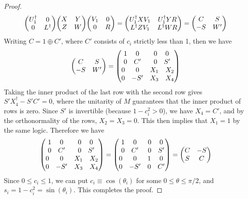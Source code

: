\documentclass[11pt]{article}
\begin{document}
\begin{proof}
    $$
    \mqty(U_1^\dagger & 0 \\ 0 & L^\dagger)\mqty(X & Y \\ Z & W) \mqty(V_1 & 0 \\ 0 & R) = \mqty(U_1^\dagger X V_1 & U^\dagger_1YR \\  L^\dagger ZV_1 & L^\dagger WR) = \mqty(C & S \\ -S & W')
    $$
    Writing $C = 1 \oplus C'$, where $C'$ consists of $c_i$ strictly less than 1, then we have
$$
    \mqty(C & S \\ -S & W') = \mqty(\mqty{1 & 0 \\ 0 & C'}  & \mqty{0 & 0 \\ 0 & S'} \\ \mqty{0 & 0 \\ 0 & -S'} & \mqty{X_1 & X_2 \\ X_3 & X_4})
$$
Taking the inner product of the last row with the second row gives $S'X_4^\dagger-S'C' = 0$, where the unitarity of $M$ guarantees that the inner product of rows is zero. Since $S'$ is invertible (because $1-c_i^2 > 0$), we have $X_4 = C'$, and by the orthonormality of the rows, $X_2 = X_3 = 0$. This then implies that $X_1 = 1$ by the same logic. Therefore we have
$$
    \mqty(\mqty{1 & 0 \\ 0 & C'}  & \mqty{0 & 0 \\ 0 & S'} \\ \mqty{0 & 0 \\ 0 & -S'} & \mqty{X_1 & X_2 \\ X_3 & X_4}) = \mqty(\mqty{1 & 0 \\ 0 & C'}  & \mqty{0 & 0 \\ 0 & S'} \\ \mqty{0 & 0 \\ 0 & -S'} & \mqty{1 & 0 \\ 0 & C'}) =\mqty(C & -S \\ S & C)
$$
Since $0 \leq c_i \leq 1$, we can put $c_i \equiv \cos(\theta_i)$ for some $0 \leq \theta \leq \pi/2$, and $s_i = 1-c_i^2 = \sin(\theta_i)$. This completes the proof.
\end{proof}
\end{document}
